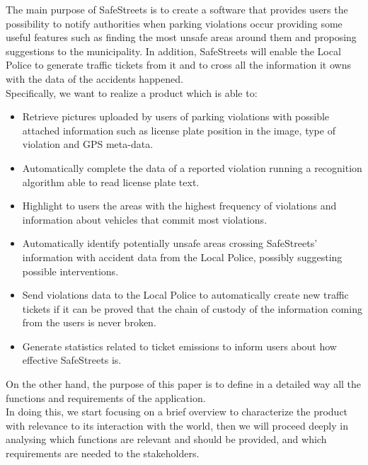 The main purpose of SafeStreets is to create a software that provides users the possibility to notify	
authorities	when parking violations occur providing some useful features such as finding the most unsafe areas around them and proposing suggestions to the municipality. In addition, SafeStreets will enable the Local Police to generate traffic tickets from it and to cross all the information it owns with the data of the accidents happened.\\
Specifically, we want to realize a product which is able to:
\begin{itemize}
	
	\item Retrieve pictures uploaded by users of parking violations with possible attached information such as license plate position in the image, type of violation and GPS meta-data.
	
	\item Automatically complete the data of a reported violation running a recognition algorithm able to read license plate text.
	
	\item Highlight to users the areas with the highest frequency of violations and information about vehicles that commit most violations.
	
	\item Automatically identify	potentially unsafe	areas crossing SafeStreets' information with accident data from the Local Police, possibly	suggesting	possible	interventions.
	
	\item Send violations data to the Local Police to automatically create new traffic tickets if it can be proved that the	chain	of	custody	of	the	information	coming	from	the	users	is	never	broken.
	
	\item Generate statistics related to ticket emissions to inform users about how effective SafeStreets is.
	
\end{itemize}

On the other hand, the purpose of this paper is to define in a detailed way all the functions and requirements of the application.\\ In doing this, we start focusing on a brief overview to characterize the product with relevance to its interaction with the world, then we will proceed deeply in analysing which functions are relevant and should be provided, and which requirements are needed to the stakeholders. 
